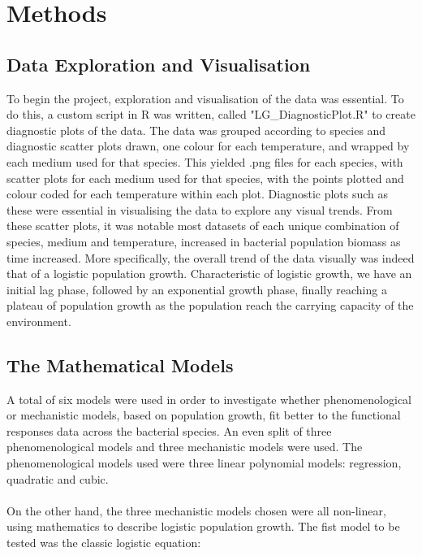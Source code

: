 \documentclass[11pt, a4paper]{article} %
\begin{document}
\section{Methods}

\subsection{Data Exploration and Visualisation}

To begin the project, exploration and visualisation of the data was essential. To do this, a custom script in R was written, called "LG\_DiagnosticPlot.R" to create diagnostic plots of the data. The data was grouped according to species and diagnostic scatter plots drawn, one colour for each temperature, and wrapped by each medium used for that species. This yielded .png files for each species, with scatter plots for each medium used for that species, with the points plotted and colour coded for each temperature within each plot. Diagnostic plots such as these were essential in visualising the data to explore any visual trends. From these scatter plots, it was notable most datasets of each unique combination of species, medium and temperature, increased in bacterial population biomass as time increased. More specifically, the overall trend of the data visually was indeed that of a logistic population growth. Characteristic of logistic growth, we have an initial lag phase, followed by an exponential growth phase, finally reaching a plateau of population growth as the population reach the carrying capacity of the environment.

\subsection{The Mathematical Models}

A total of six models were used in order to investigate whether phenomenological or mechanistic models, based on population growth, fit better to the functional responses data across the bacterial species. An even split of three phenomenological models and three mechanistic models were used. The phenomenological models used were three linear polynomial models: regression, quadratic and cubic.
\paragraph{} On the other hand, the three mechanistic models chosen were all non-linear, using mathematics to describe logistic population growth. The fist model to be tested was the classic logistic equation:
\end{document}
